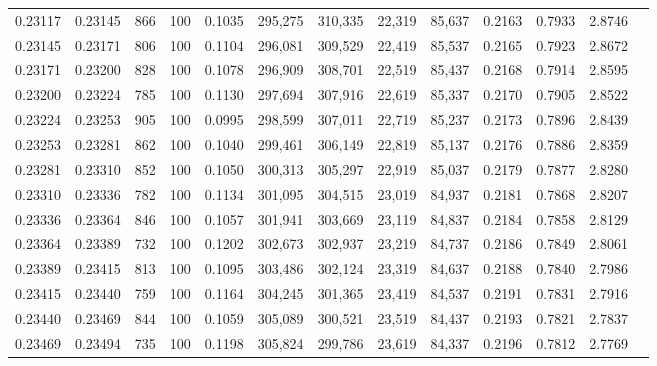 \begin{tabular}{rrrrrrrrrrrrr}
0.23117 & 0.23145 &   866 & 100 &                                     0.1035 & 295,275 & 310,335 &  22,319 &  85,637 & 0.2163 & 0.7933 & 2.8746 \\
0.23145 & 0.23171 &   806 & 100 &                                     0.1104 & 296,081 & 309,529 &  22,419 &  85,537 & 0.2165 & 0.7923 & 2.8672 \\
0.23171 & 0.23200 &   828 & 100 &                                     0.1078 & 296,909 & 308,701 &  22,519 &  85,437 & 0.2168 & 0.7914 & 2.8595 \\
0.23200 & 0.23224 &   785 & 100 &                                     0.1130 & 297,694 & 307,916 &  22,619 &  85,337 & 0.2170 & 0.7905 & 2.8522 \\
0.23224 & 0.23253 &   905 & 100 &                                     0.0995 & 298,599 & 307,011 &  22,719 &  85,237 & 0.2173 & 0.7896 & 2.8439 \\
0.23253 & 0.23281 &   862 & 100 &                                     0.1040 & 299,461 & 306,149 &  22,819 &  85,137 & 0.2176 & 0.7886 & 2.8359 \\
0.23281 & 0.23310 &   852 & 100 &                                     0.1050 & 300,313 & 305,297 &  22,919 &  85,037 & 0.2179 & 0.7877 & 2.8280 \\
0.23310 & 0.23336 &   782 & 100 &                                     0.1134 & 301,095 & 304,515 &  23,019 &  84,937 & 0.2181 & 0.7868 & 2.8207 \\
0.23336 & 0.23364 &   846 & 100 &                                     0.1057 & 301,941 & 303,669 &  23,119 &  84,837 & 0.2184 & 0.7858 & 2.8129 \\
0.23364 & 0.23389 &   732 & 100 &                                     0.1202 & 302,673 & 302,937 &  23,219 &  84,737 & 0.2186 & 0.7849 & 2.8061 \\
0.23389 & 0.23415 &   813 & 100 &                                     0.1095 & 303,486 & 302,124 &  23,319 &  84,637 & 0.2188 & 0.7840 & 2.7986 \\
0.23415 & 0.23440 &   759 & 100 &                                     0.1164 & 304,245 & 301,365 &  23,419 &  84,537 & 0.2191 & 0.7831 & 2.7916 \\
0.23440 & 0.23469 &   844 & 100 &                                     0.1059 & 305,089 & 300,521 &  23,519 &  84,437 & 0.2193 & 0.7821 & 2.7837 \\
0.23469 & 0.23494 &   735 & 100 &                                     0.1198 & 305,824 & 299,786 &  23,619 &  84,337 & 0.2196 & 0.7812 & 2.7769 \\

\end{tabular}
